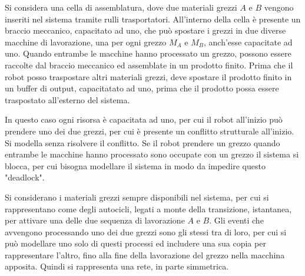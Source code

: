 \documentclass{article}
\numberwithin{equation}{subsection}
\begin{document}
Si considera una cella di assemblatura, dove due materiali grezzi $A$ e $B$ vengono inseriti nel sistema tramite rulli trasportatori. All'interno della cella è presente un 
braccio meccanico, capacitato ad uno, che può spostare i grezzi in due diverse macchine di lavorazione, una per ogni grezzo $M_A$ e $M_B$, anch'esse capacitate ad uno. 
Quando entrambe le macchine hanno processato un grezzo, possono essere raccolte dal braccio meccanico ed assemblate in un prodotto finito. Prima che il robot posso traspostare 
altri materiali grezzi, deve spostare il prodotto finito in un buffer di output, capacitatato ad uno, prima che il prodotto possa essere traspostato all'esterno del sistema. 

In questo caso ogni risorsa è capacitata ad uno, per cui il robot all'inizio può prendere uno dei due grezzi, per cui è presente un conflitto strutturale all'inizio. Si 
modella senza risolvere il conflitto. Se il robot prendere un grezzo quando entrambe le macchine hanno processato sono occupate con un grezzo il sistema si blocca, per cui 
bisogna modellare il sistema in modo da impedire questo "deadlock". 

Si considerano i materiali grezzi sempre disponibili nel sistema, per cui si rappresentano come degli autocicli, legati a monte della transizione, istantanea, per attivare 
una delle due sequenza di lavorazione $A$ e $B$. Gli eventi che avvengono processando uno dei due grezzi sono gli stessi tra di loro, per cui si può modellare uno solo di 
questi processi ed includere una sua copia per rappresentare l'altro, fino alla fine della lavorazione del grezzo nella macchina apposita. Quindi si rappresenta una 
rete, in parte simmetrica. 
\end{document}
